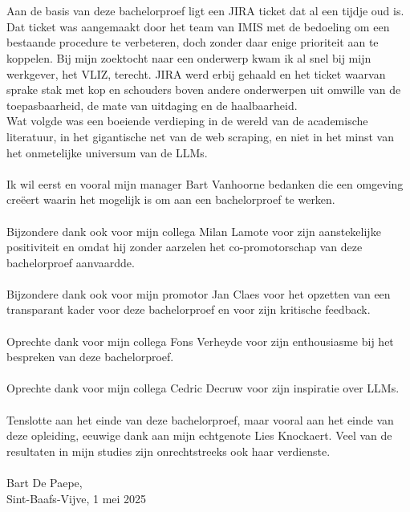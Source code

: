 
\chapter*{}%
\label{ch:voorwoord}


Aan de basis van deze bachelorproef ligt een JIRA ticket dat al een tijdje oud is. Dat ticket was aangemaakt door het team van IMIS met de bedoeling om een bestaande procedure te verbeteren, doch zonder daar enige prioriteit aan te koppelen. Bij mijn zoektocht naar een onderwerp kwam ik al snel bij mijn werkgever, het VLIZ, terecht. JIRA werd erbij gehaald en het ticket waarvan sprake stak met kop en schouders boven andere onderwerpen uit omwille van de toepasbaarheid, de mate van uitdaging en de haalbaarheid.\\
Wat volgde was een boeiende verdieping in de wereld van de academische literatuur, in het gigantische net van de web scraping, en niet in het minst van het onmetelijke universum van de LLMs.\\\\
Ik wil eerst en vooral mijn manager Bart Vanhoorne bedanken die een omgeving creëert waarin het mogelijk is om aan een bachelorproef te werken.\\\\
Bijzondere dank ook voor mijn collega Milan Lamote voor zijn aanstekelijke positiviteit en omdat hij zonder aarzelen het co-promotorschap van deze bachelorproef aanvaardde.\\\\
Bijzondere dank ook voor mijn promotor Jan Claes voor het opzetten van een transparant kader voor deze bachelorproef en voor zijn kritische feedback.\\\\
Oprechte dank voor mijn collega Fons Verheyde voor zijn enthousiasme bij het bespreken van deze bachelorproef.\\\\
Oprechte dank voor mijn collega Cedric Decruw voor zijn inspiratie over LLMs.\\\\
Tenslotte aan het einde van deze bachelorproef, maar vooral aan het einde van deze opleiding, eeuwige dank aan mijn echtgenote Lies Knockaert. Veel van de resultaten in mijn studies zijn onrechtstreeks ook haar verdienste.
\\\\
Bart De Paepe,\\
Sint-Baafs-Vijve, 1 mei 2025